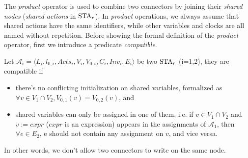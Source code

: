 The \emph{product} operator is used to combine two connectors by joining their \emph{shared nodes} (\emph{shared actions} in $\mbox{STA}_r$). In \emph{product} operations, we always assume that shared actions have the same identifiers, while other variables and clocks are all named without repetition. Before showing the formal definition of the \emph{product} operator, first we introduce a predicate \emph{compatible}.

\begin{definition}
    Let $\mathscr{A}_{i}=\langle L_{i}, l_{0,i}, Acts_{i}, V_{i}, V_{0,i}, C_{i}, Inv_{i}, E_{i} \rangle$ be two $\mbox{STA}_r$ (i=1,2), they are compatible if
    \begin{itemize}
        \item there's no conflicting initialization on shared variables, formalized as $\forall v\in V_1\cap V_2, V_{0,1}(v) = V_{0,2}(v)$, and
        \item shared variables can only be assigned in one of them, i.e. if $v\in V_1\cap V_2$ and $v:=expr$ ($expr$ is an expression) appears in the assignments of $\mathscr{A}_1$, then $\forall e\in E_2$, e should not contain any assignment on $v$, and vice versa.
    \end{itemize}
    In other words, we don't allow two connectors to write on the same node. 
\end{definition}

